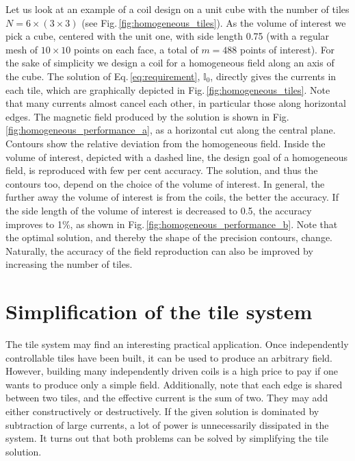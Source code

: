 Let us look at an example of a coil design on a unit cube with the number of tiles $N = 6 \times (3 \times 3)$ (see Fig.\,\ref{fig:homogeneous_tiles}). As the volume of interest we pick a cube, centered with the unit one, with side length 0.75 (with a regular mesh of $10 \times 10$ points on each face, a total of $m = 488$ points of interest). For the sake of simplicity we design a coil for a homogeneous field along an axis of the cube. The solution of Eq.\,\ref{eq:requirement}, $\mathbb{I}_0$, directly gives the currents in each tile, which are graphically depicted in Fig.\,\ref{fig:homogeneous_tiles}. Note that many currents almost cancel each other, in particular those along horizontal edges. The magnetic field produced by the solution is shown in Fig.\,\ref{fig:homogeneous_performance_a}, as a horizontal cut along the central plane. Contours show the relative deviation from the homogeneous field. Inside the volume of interest, depicted with a dashed line, the design goal of a homogeneous field, is reproduced with few per cent accuracy. The solution, and thus the contours too, depend on the choice of the volume of interest. In general, the further away the volume of interest is from the coils, the better the accuracy. If the side length of the volume of interest is decreased to 0.5, the accuracy improves to 1\%, as shown in Fig.\,\ref{fig:homogeneous_performance_b}. Note that the optimal solution, and thereby the shape of the precision contours, change. Naturally, the accuracy of the field reproduction can also be improved by increasing the number of tiles.



\section{Simplification of the tile system}
The tile system may find an interesting practical application. Once independently controllable tiles have been built, it can be used to produce an arbitrary field. However, building many independently driven coils is a high price to pay if one wants to produce only a simple field. Additionally, note that each edge is shared between two tiles, and the effective current is the sum of two. They may add either constructively or destructively. If the given solution is dominated by subtraction of large currents, a lot of power is unnecessarily dissipated in the system. It turns out that both problems can be solved by simplifying the tile solution.

